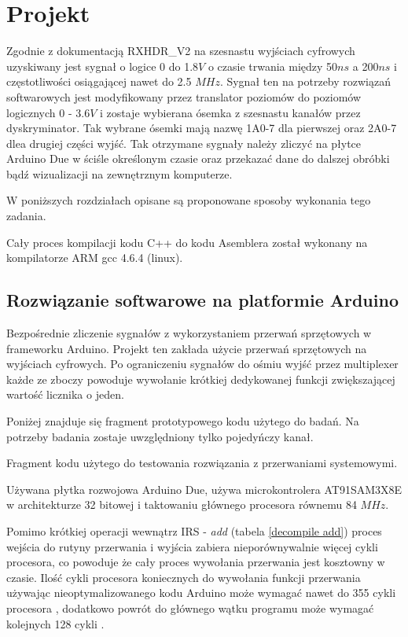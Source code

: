 \documentclass[a4paper,12pt]{article}
\begin{document}
\section{Projekt}

Zgodnie z dokumentacją RXHDR\_V2 \cite{master} na szesnastu wyjściach cyfrowych uzyskiwany jest sygnał o logice 0 do 1.8$V$ o czasie trwania między 50$ns$ a 200$ns$ i częstotliwości osiągającej nawet do 2.5 $MHz$.
Sygnał ten na potrzeby rozwiązań softwarowych jest modyfikowany przez translator poziomów do poziomów logicznych 0 - 3.6$V$ i zostaje wybierana ósemka z szesnastu kanałów przez dyskryminator.   
Tak wybrane ósemki mają nazwę 1A0-7 dla pierwszej oraz 2A0-7 dlea drugiej części wyjść.   
Tak otrzymane sygnały należy zliczyć na płytce Arduino Due w ściśle określonym czasie oraz przekazać dane do dalszej obróbki bądź wizualizacji na zewnętrznym komputerze.

W poniższych rozdziałach opisane są proponowane sposoby wykonania tego zadania. 

Cały proces kompilacji kodu C++ do kodu Asemblera został wykonany na kompilatorze ARM gcc 4.6.4 (linux). 

\subsection{Rozwiązanie softwarowe na platformie Arduino}
Bezpośrednie zliczenie sygnałów z wykorzystaniem przerwań sprzętowych w frameworku Arduino. Projekt ten zakłada użycie przerwań sprzętowych na wyjściach cyfrowych. 
Po ograniczeniu sygnałów do ośmiu wyjść przez multiplexer każde ze zboczy powoduje wywołanie krótkiej dedykowanej funkcji zwiększającej wartość licznika o jeden. 

Poniżej znajduje się fragment prototypowego kodu użytego do badań. Na potrzeby badania zostaje uwzględniony tylko pojedyńczy kanał.

\begin{kod}
        
        \caption{Fragment kodu użytego do testowania rozwiązania z przerwaniami systemowymi.}
        \label{code_ard_IRS}
\end{kod}


Używana płytka rozwojowa Arduino Due, używa microkontrolera AT91SAM3X8E w architekturze 32 bitowej i taktowaniu głównego procesora równemu 84 $MHz$.

Pomimo krótkiej operacji wewnątrz IRS - \textit{add} (tabela \ref{decompile add}) proces wejścia do rutyny przerwania i wyjścia zabiera nieporównywalnie więcej cykli procesora, co powoduje że cały proces wywołania przerwania jest kosztowny w czasie. 
Ilość cykli procesora koniecznych do wywołania funkcji przerwania używając nieoptymalizowanego kodu Arduino może wymagać nawet do 355 cykli procesora \cite{ard_opt_git}, dodatkowo powrót do głównego wątku programu może wymagać kolejnych 128 cykli \cite{ard_opt_git}.
\end{document}
